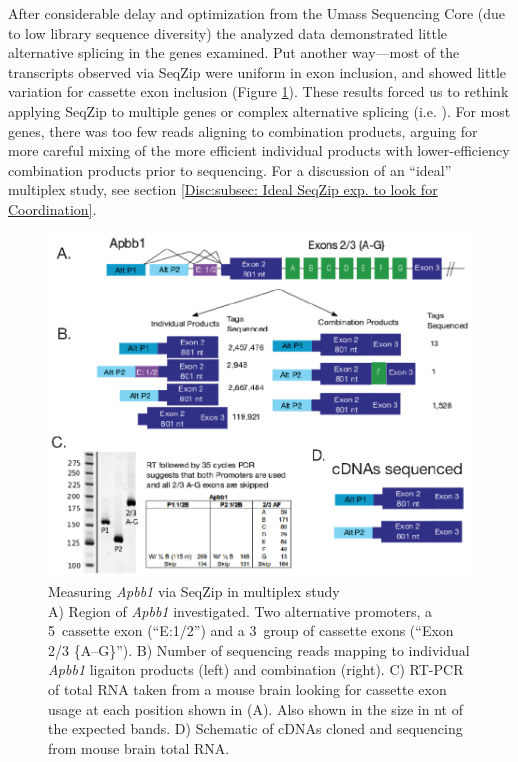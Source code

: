   After considerable delay and optimization from the Umass Sequencing Core (due to low library sequence diversity) the analyzed data demonstrated little alternative splicing in the genes examined. Put another way---most of the transcripts observed via SeqZip were uniform in exon inclusion, and showed little variation for cassette exon inclusion (Figure \ref{SeqZipMethod:fig:Apbb1 Results}). These results forced us to rethink applying SeqZip to multiple genes or complex alternative splicing (i.e. \dscam{}). For most genes, there was too few reads aligning to combination products, arguing for more careful mixing of the more efficient individual products with lower-efficiency combination products prior to sequencing. For a discussion of an ``ideal'' multiplex study, see section \ref{Disc:subsec: Ideal SeqZip exp. to look for Coordination}.

  \begin{figure} %
    \centering 
    \includegraphics{Figures/SeqZipMethod/Apbb1.eps}
    \caption[Measuring \textit{Apbb1} via SeqZip in multiplex study]
    {
      Measuring \textit{Apbb1} via SeqZip in multiplex study\\[0.25cm]
      A) Region of \textit{Apbb1} investigated. Two alternative promoters, a 5\textprime~cassette exon (``E:1/2'') and a 3\textprime~group of cassette exons (``Exon 2/3 \{A--G\}''). B) Number of sequencing reads mapping to individual \textit{Apbb1} ligaiton products (left) and combination (right). C) RT-PCR of total RNA taken from a mouse brain looking for cassette exon usage at each position shown in (A). Also shown in the size in nt of the expected bands. D) Schematic of cDNAs cloned and sequencing from mouse brain total RNA.
      }
    \label{SeqZipMethod:fig:Apbb1 Results}
    \end{figure}

